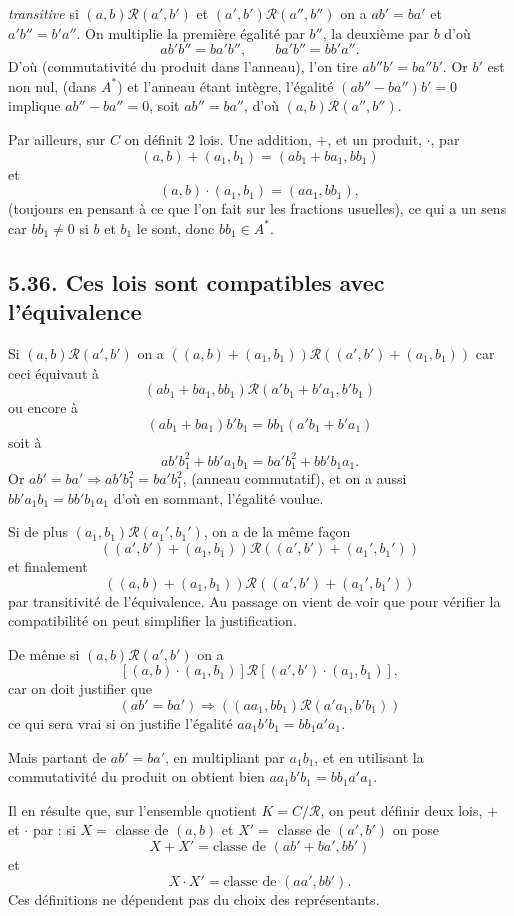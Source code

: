 \emph{transitive} si $(a,b)\mathcal R(a',b')$ et $(a',b')\mathcal R(a'',b'')$ on a $ab'=ba'$ et $a'b''=b'a''$. On multiplie la première égalité par $b''$, la deuxième par $b$ d'où
\[
ab'b''=ba'b'',\qquad ba'b''=bb'a''.
\]
D'où (commutativité du produit dans l'anneau), l'on tire $ab''b'=ba''b'$. Or $b'$ est non nul, (dans $A^*$) et l'anneau étant intègre, l'égalité $(ab''-ba'')b'=0$ implique $ab''-ba''=0$, soit $ab''=ba''$, d'où $(a,b)\mathcal R(a'',b'')$. \bookend

Par ailleurs, sur $C$ on définit 2 lois. Une addition, $+$, et un produit, $\cdot$, par
\[
(a,b)+(a_1,b_1)=(ab_1+ba_1,bb_1)
\]
et
\[
(a,b)\cdot(a_1,b_1)=(aa_1,bb_1),
\]
(toujours en pensant à ce que l'on fait sur les fractions usuelles), ce qui a un sens car $bb_1\ne0$ si $b$ et $b_1$ le sont, donc $bb_1\in A^*$.

\subsection*{5.36. Ces lois sont compatibles avec l'équivalence}
Si $(a,b)\mathcal R(a',b')$ on a $((a,b)+(a_1,b_1))\mathcal R((a',b')+(a_1,b_1))$ car ceci équivaut à
\[
(ab_1+ba_1,b b_1)\mathcal R(a'b_1+b'a_1,b'b_1)
\]
ou encore à
\[
(ab_1+ba_1)b'b_1=bb_1(a'b_1+b'a_1)
\]
soit à
\[
ab'b_1^2+bb'a_1b_1=ba'b_1^2+bb'b_1a_1.
\]
Or $ab'=ba'\Rightarrow ab'b_1^2=ba'b_1^2$, (anneau commutatif), et on a aussi $bb'a_1b_1=bb'b_1a_1$ d'où en sommant, l'égalité voulue.

Si de plus $(a_1,b_1)\mathcal R(a_1',b_1')$, on a de la même façon
\[
((a',b')+(a_1,b_1))\mathcal R((a',b')+(a_1',b_1'))
\]
et finalement
\[
((a,b)+(a_1,b_1))\mathcal R((a',b')+(a_1',b_1'))
\]
par transitivité de l'équivalence. Au passage on vient de voir que pour vérifier la compatibilité on peut simplifier la justification.

De même si $(a,b)\mathcal R(a',b')$ on a
\[
[(a,b)\cdot(a_1,b_1)]\mathcal R[(a',b')\cdot(a_1,b_1)],
\]
car on doit justifier que
\[
(ab'=ba')\Rightarrow((aa_1,bb_1)\mathcal R(a'a_1,b'b_1))
\]
ce qui sera vrai si on justifie l'égalité $aa_1b'b_1=bb_1a'a_1$.

Mais partant de $ab'=ba'$, en multipliant par $a_1b_1$, et en utilisant la commutativité du produit on obtient bien $aa_1b'b_1=bb_1a'a_1$. \bookend

Il en résulte que, sur l'ensemble quotient $K=C/\mathcal R$, on peut définir deux lois, $+$ et $\cdot$ par : si $X=$ classe de $(a,b)$ et $X'=$ classe de $(a',b')$ on pose
\[
X+X'=\text{classe de }(ab'+ba',bb')
\]
et
\[
X\cdot X'=\text{classe de }(aa',bb').
\]
Ces définitions ne dépendent pas du choix des représentants.

